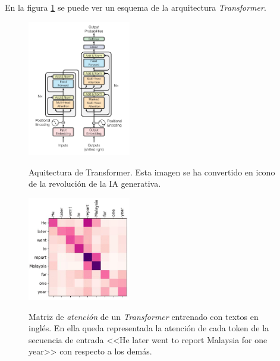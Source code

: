 En la figura \ref{fig:transformer_architecture} se puede ver un esquema de la arquitectura \textit{Transformer}.

\begin{figure}[H]
    \caption[Aquitectura de Transformer]{Aquitectura de Transformer. Esta imagen se ha convertido en icono de la revolución de la IA generativa.}
    \centering
    \includegraphics[width=0.4\textwidth]{./figuras/Transformer_architecture.png}
    \label{fig:transformer_architecture}
\end{figure}

\begin{figure}[H]
    \caption[Matriz de \textit{atención} de un \textit{Transformer} entrenado con textos en inglés]{Matriz de \textit{atención} de un \textit{Transformer} entrenado con textos en inglés. En ella queda representada la atención de cada token de la secuencia de entrada <<He later went to report Malaysia for one year>> con respecto a los demás.}
    \centering
    \includegraphics[width=0.4\textwidth]{./figuras/Transformer_attention_matrix.png}
    \label{fig:transformer_attention}
\end{figure}
